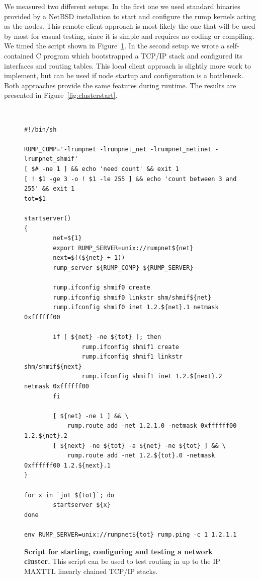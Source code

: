We measured two different setups.  In the first one we used standard
binaries provided by a NetBSD installation to start and configure
the rump kernels acting as the nodes.  This remote client approach
is most likely the one that will be used by most for casual testing,
since it is simple and requires no coding or compiling.  We timed
the script shown in Figure~\ref{fig:testping.sh}.  In the second
setup we wrote a self-contained C program which bootstrapped a
TCP/IP stack and configured its interfaces and routing tables.
This local client approach is slightly more work to implement, but
can be used if node startup and configuration is a bottleneck.
Both approaches provide the same features during runtime.  The
results are presented in Figure~\ref{fig:clusterstart}.

\begin{figure}
{\tt \scriptsize
\begin{verbatim}
#!/bin/sh

RUMP_COMP='-lrumpnet -lrumpnet_net -lrumpnet_netinet -lrumpnet_shmif'
[ $# -ne 1 ] && echo 'need count' && exit 1
[ ! $1 -ge 3 -o ! $1 -le 255 ] && echo 'count between 3 and 255' && exit 1
tot=$1

startserver()
{
        net=${1}
        export RUMP_SERVER=unix://rumpnet${net}
        next=$((${net} + 1))
        rump_server ${RUMP_COMP} ${RUMP_SERVER}

        rump.ifconfig shmif0 create
        rump.ifconfig shmif0 linkstr shm/shmif${net}
        rump.ifconfig shmif0 inet 1.2.${net}.1 netmask 0xffffff00

        if [ ${net} -ne ${tot} ]; then
                rump.ifconfig shmif1 create
                rump.ifconfig shmif1 linkstr shm/shmif${next}
                rump.ifconfig shmif1 inet 1.2.${next}.2 netmask 0xffffff00
        fi

        [ ${net} -ne 1 ] && \
            rump.route add -net 1.2.1.0 -netmask 0xffffff00 1.2.${net}.2
        [ ${next} -ne ${tot} -a ${net} -ne ${tot} ] && \
            rump.route add -net 1.2.${tot}.0 -netmask 0xffffff00 1.2.${next}.1
}

for x in `jot ${tot}`; do
        startserver ${x}
done

env RUMP_SERVER=unix://rumpnet${tot} rump.ping -c 1 1.2.1.1
\end{verbatim}}
\caption[Script for starting, configuring and testing a network cluster]{
\textbf{Script for starting, configuring and testing a network cluster.}
This script can be used to test routing in up to the IP MAXTTL linearly
chained TCP/IP stacks.
}
\label{fig:testping.sh}
\end{figure}


